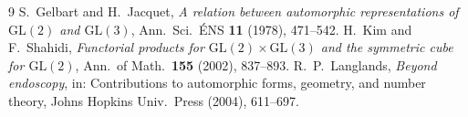 \documentclass[11pt]{article}
\begin{document}
\begin{thebibliography}{9}
 S.~Gelbart and H.~Jacquet, \emph{A relation between automorphic representations
of $\mathrm{GL}(2)$ and $\mathrm{GL}(3)$}, Ann.\ Sci.\ \'ENS \textbf{11} (1978), 471--542.
 H.~Kim and F.~Shahidi, \emph{Functorial products for
$\mathrm{GL}(2)\times\mathrm{GL}(3)$ and the symmetric cube for $\mathrm{GL}(2)$}, Ann.\ of
Math.\ \textbf{155} (2002), 837--893.
 R.~P.~Langlands, \emph{Beyond endoscopy}, in: Contributions to automorphic
forms, geometry, and number theory, Johns Hopkins Univ.\ Press (2004), 611--697.
\end{thebibliography}
\end{document}
